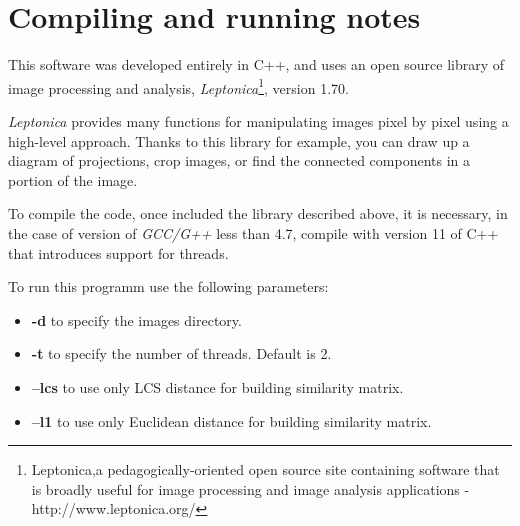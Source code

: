 \section{Compiling and running notes}

This software was developed entirely in C++, and uses an open source library of image processing and analysis, \emph{Leptonica}\footnote{Leptonica,a pedagogically-oriented open source site containing software that is broadly useful for image processing and image analysis applications -http://www.leptonica.org/}, version 1.70.

\emph{Leptonica} provides many functions for manipulating images pixel by pixel using a high-level approach. Thanks to this library for example, you can draw up a diagram of projections, crop images, or find the connected components in a portion of the image.

To compile the code, once included the library described above, it is necessary, in the case of version of \emph{GCC/G++} less than 4.7, compile with version 11 of C++ that introduces support for threads.

To run this programm use the following parameters:
\begin{itemize}
\item \textbf{-d} to specify the images directory.
\item \textbf{-t} to specify the number of threads. Default is 2.
\item \textbf{--lcs} to use only LCS distance for building similarity matrix.
\item \textbf{--l1} to use only Euclidean distance for building similarity matrix.
\end{itemize}